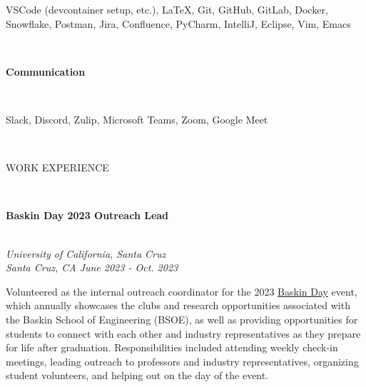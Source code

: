 \documentclass[letterpaper,10pt]{article}
\begin{document}
\begin{multicols*}{2}
  \begin{minipage}{.45\textwidth}
    \begin{flushleft}
      VSCode (devcontainer setup, etc.), \LaTeX, Git, GitHub, GitLab, Docker, Snowflake, Postman, Jira, Confluence, PyCharm, IntelliJ, Eclipse, Vim, Emacs
    \end{flushleft}
  \end{minipage}
  \vspace{.5em} \\
  \begin{large} \textbf{Communication} \end{large}
  \vspace{3px} \\ \indent
  \begin{minipage}{.45\textwidth}
    \begin{flushleft}
      Slack, Discord, Zulip, Microsoft Teams, Zoom, Google Meet
    \end{flushleft}
  \end{minipage}
  \columnbreak \\
  \begin{LARGE}
    \faBriefcase\hspace{5px}WORK EXPERIENCE
  \end{LARGE}
  \vspace{.5em} \\
  \begin{large} \textbf{Baskin Day 2023 Outreach Lead} \end{large} \\
  \textit{University of California, Santa Cruz \\ Santa Cruz, CA \hfill June 2023 - Oct. 2023}
  \vspace{5px} \\
  \begin{minipage}{.5\textwidth}
    \begin{flushleft}
      Volunteered as the internal outreach coordinator for the 2023 \href{https://baskinday.soe.ucsc.edu/}{Baskin Day} event, which annually showcases the clubs and research opportunities associated with the Baskin School of Engineering (BSOE), as well as providing opportunities for students to connect with each other and industry representatives as they prepare for life after graduation. Responsibilities included attending weekly check-in meetings, leading outreach to professors and industry representatives, organizing student volunteers, and helping out on the day of the event.

\end{flushleft}
\end{minipage}
\end{multicols*}
\end{document}
